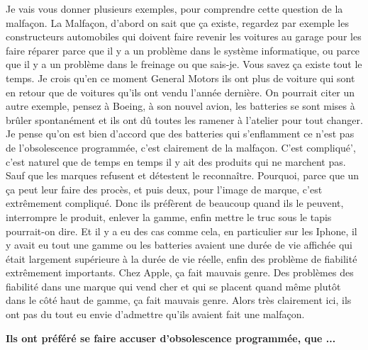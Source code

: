\begin{small}
Je vais vous donner plusieurs exemples, pour comprendre cette question de la malfaçon. La Malfaçon, d'abord on sait que ça existe, regardez par exemple les constructeurs automobiles qui doivent faire revenir les voitures au garage pour les faire réparer parce que il y a un problème dans le système informatique, ou parce que il y a un problème dans le freinage ou que sais-je. Vous savez ça existe tout le temps. Je crois qu'en ce moment General Motors ils ont plus de voiture qui sont en retour que de voitures qu'ils ont vendu l'année dernière. 
On pourrait citer un autre exemple, pensez à Boeing, à son nouvel avion, les batteries se sont mises à brûler spontanément et ils ont dû toutes les ramener à l'atelier pour tout changer. Je pense qu'on est bien d'accord que des batteries qui s'enflamment ce n'est pas de l'obsolescence programmée, c'est clairement de la malfaçon. C'est compliqué', c'est naturel que de temps en temps il y ait des produits qui ne marchent pas. Sauf que les marques refusent et détestent le reconnaître. Pourquoi, parce que un ça peut leur faire des procès, et puis deux, pour l'image de marque, c'est extrêmement compliqué. Donc ils préfèrent de beaucoup quand ils le peuvent, interrompre le produit, enlever la gamme, enfin mettre le truc sous le tapis pourrait-on dire. 
Et il y a eu des cas comme cela, en particulier sur les Iphone, il y avait eu tout une gamme ou les batteries avaient une durée de vie affichée qui était largement supérieure à la durée de vie réelle, enfin des problème de fiabilité extrêmement importants. Chez Apple, ça fait mauvais genre. Des problèmes des fiabilité dans une marque qui vend cher et qui se placent quand même plutôt dans le côté haut de gamme, ça fait mauvais genre. Alors très clairement ici, ils ont pas du tout eu envie d'admettre qu'ils avaient fait une malfaçon.

\textbf{Ils ont préféré se faire accuser d'obsolescence programmée, que ...}
\smallbreak



\end{small}

